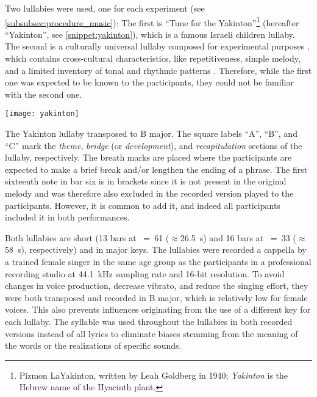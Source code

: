 Two lullabies were used, one for each experiment (see \cref{subsubsec:procedure_music}):
The first is \enquote{Tune for the Yakinton}\footnote{Pizmon LaYakinton,
written by Leah Goldberg in 1940; \emph{Yakinton} is the Hebrew name of the Hyacinth plant.} (hereafter \enquote{Yakinton}, see \cref{snippet:yakinton}), which is a famous Israeli children lullaby.
The second is a culturally universal lullaby composed for experimental purposes \citep[][pp.~22-47, see \cref{snippet:uni-lullaby}]{Twig2016universal}, which contains cross-cultural characteristics, like repetitiveness, simple melody, and a limited inventory of tonal and rhythmic patterns \citep{Unyk1992lullabies, Trehub1993maternal}.
Therefore, while the first one was expected to be known to the participants, they could not be familiar with the second one.
%
\begin{snippet}[t]
	\centering
	\texttt{[image: yakinton]}
	\caption[Yakinton lullaby]
		{The Yakinton lullaby transposed to B major.
		The square labels \enquote{A}, \enquote{B}, and \enquote{C} mark the \emph{theme}, \emph{bridge} (or \emph{development}), and \emph{recapitulation} sections of the lullaby, respectively.
		The breath marks are placed where the participants are expected to make a brief break and/or lengthen the ending of a phrase.
		The first sixteenth note in bar six is in brackets since it is not present in the original melody and was therefore also excluded in the recorded version played to the participants.
		However, it is common to add it, and indeed all participants included it in both performances.}
	\label{snippet:yakinton}
\end{snippet}
%
Both lullabies are short (13 bars at \musQuarter~=~61 ($\approx$\SI{26.5}{\second}) and 16 bars at \musQuarterDotted~=~33 ($\approx$\SI{58}{\second}), respectively) and in major keys.
The lullabies were recorded a cappella by a trained female singer in the same age group as the participants in a professional recording studio at \SI{44.1}{\kilo\hertz} sampling rate and 16-bit resolution.
To avoid changes in voice production, decrease vibrato, and reduce the singing effort, they were both transposed and recorded in B major, which is relatively low for female voices.
This also prevents influences originating from the use of a different key for each lullaby.
The syllable \textipa{[na]} was used throughout the lullabies in both recorded versions instead of all lyrics to eliminate biases stemming from the meaning of the words or the realizations of specific sounds.
